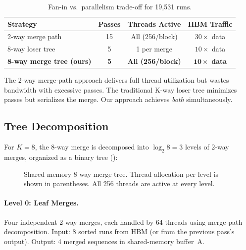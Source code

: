 \documentclass[conference,10pt]{IEEEtran}
\newcommand{\placeholderfig}[2]{%
  \begin{center}
    \fbox{\parbox{0.9\columnwidth}{\centering\vspace{#1}\textit{[Figure placeholder: #2]}\vspace{#1}}}
  \end{center}
}
\begin{document}
\begin{table}[t]
  \centering
  \caption{Fan-in vs.\ parallelism trade-off for 19{,}531 runs.}
  \label{tab:tradeoff}
  \begin{tabular}{@{}lccc@{}}
    \toprule
    \textbf{Strategy} & \textbf{Passes} & \textbf{Threads Active} & \textbf{HBM Traffic} \\
    \midrule
    2-way merge path  & 15 & All (256/block)     & $30\times$ data \\
    8-way loser tree   & 5  & 1 per merge         & $10\times$ data \\
    \textbf{8-way merge tree (ours)} & \textbf{5} & \textbf{All (256/block)} & $\mathbf{10\times}$ \textbf{data} \\
    \bottomrule
  \end{tabular}
\end{table}

The 2-way merge-path approach delivers full thread utilization but
wastes bandwidth with excessive passes.  The traditional K-way loser tree
minimizes passes but serializes the merge.  Our approach achieves
\emph{both} simultaneously.

\subsection{Tree Decomposition}
\label{sec:tree_decomp}

For $K{=}8$, the 8-way merge is decomposed into $\log_2 8 = 3$ levels of
2-way merges, organized as a binary tree ():

\begin{figure}[t]
  \placeholderfig{3cm}{Merge tree diagram showing 3 levels for $K{=}8$.
  Level~0: four 2-way merges (runs 0+1, 2+3, 4+5, 6+7), each with 64
  threads.  Level~1: two 2-way merges combining Level~0 outputs, each
  with 128 threads.  Level~2: one final 2-way merge with 256 threads.
  Arrows show data flow through shared-memory ping-pong buffers.  Only
  the Level~2 output writes to HBM.}
  \caption{Shared-memory 8-way merge tree.  Thread allocation per
  level is shown in parentheses.  All 256 threads are active at every
  level.}
  \label{fig:merge_tree}
\end{figure}

\paragraph{Level 0: Leaf Merges.}
Four independent 2-way merges, each handled by 64 threads using
merge-path decomposition.  Input: 8 sorted runs from HBM (or from the
previous pass's output).  Output: 4 merged sequences in shared-memory
buffer~A.
\end{document}

